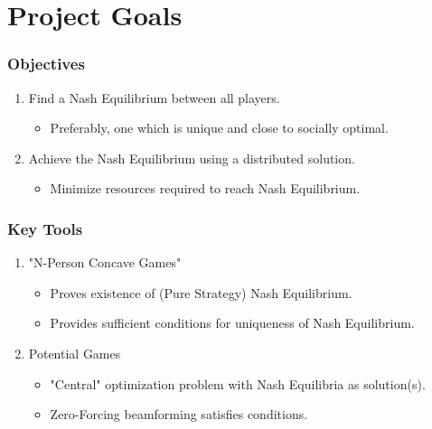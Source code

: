 \documentclass[10pt,tgadventor, onlymath]{beamer}
\begin{document}
\section{Project Goals}

\begin{frame}
\frametitle{Objectives}
\begin{enumerate}
\item Find a Nash Equilibrium between all players.
\begin{itemize}
\item Preferably, one which is unique and close to socially optimal.
\end{itemize}
\item Achieve the Nash Equilibrium using a distributed solution.
\begin{itemize}
\item Minimize resources required to reach Nash Equilibrium.
\end{itemize}
\end{enumerate}

\begin{center}
\end{center}
\end{frame}

\begin{frame}
\frametitle{Key Tools}
\begin{enumerate}
\item "N-Person Concave Games"
\begin{itemize}
\item Proves existence of (Pure Strategy) Nash Equilibrium.
\item Provides sufficient conditions for uniqueness of Nash Equilibrium.
\end{itemize}
\item 
Potential Games
\begin{itemize}
\item "Central" optimization problem with Nash Equilibria as solution(s).
\item Zero-Forcing beamforming satisfies conditions.
\end{itemize}
\end{enumerate}
\end{frame}
%
\end{document}
